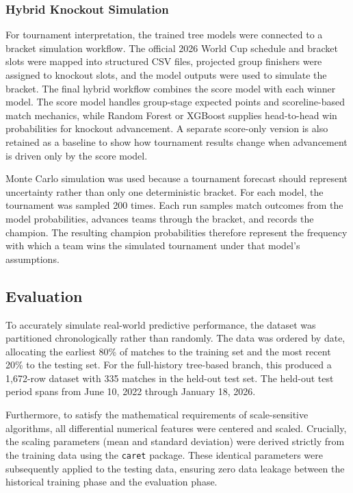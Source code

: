 \documentclass[11pt]{article}
\begin{document}
\subsubsection{Hybrid Knockout Simulation}
\label{subsec:hybrid_simulation}
For tournament interpretation, the trained tree models were connected to a bracket simulation workflow. The official 2026 World Cup schedule and bracket slots were mapped into structured CSV files, projected group finishers were assigned to knockout slots, and the model outputs were used to simulate the bracket. The final hybrid workflow combines the score model with each winner model. The score model handles group-stage expected points and scoreline-based match mechanics, while Random Forest or XGBoost supplies head-to-head win probabilities for knockout advancement. A separate score-only version is also retained as a baseline to show how tournament results change when advancement is driven only by the score model.

Monte Carlo simulation was used because a tournament forecast should represent uncertainty rather than only one deterministic bracket. For each model, the tournament was sampled 200 times. Each run samples match outcomes from the model probabilities, advances teams through the bracket, and records the champion. The resulting champion probabilities therefore represent the frequency with which a team wins the simulated tournament under that model's assumptions.

\subsection{Evaluation}

To accurately simulate real-world predictive performance, the dataset was partitioned chronologically rather than randomly. The data was ordered by date, allocating the earliest 80\% of matches to the training set and the most recent 20\% to the testing set. For the full-history tree-based branch, this produced a 1,672-row dataset with 335 matches in the held-out test set. The held-out test period spans from June 10, 2022 through January 18, 2026.

Furthermore, to satisfy the mathematical requirements of scale-sensitive algorithms, all differential numerical features were centered and scaled. Crucially, the scaling parameters (mean and standard deviation) were derived strictly from the training data using the \texttt{caret} package. These identical parameters were subsequently applied to the testing data, ensuring zero data leakage between the historical training phase and the evaluation phase.
\end{document}
